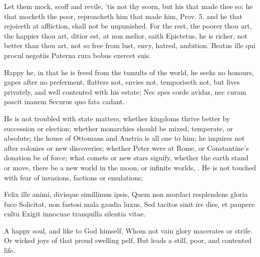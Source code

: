 {Let them mock, scoff and revile, 'tis not thy scorn, but his that made
thee so; he that mocketh the poor, reproacheth him that made him, Prov.
 5. and he that rejoiceth at affliction, shall not be unpunished.
For the rest, the poorer thou art, the happier thou art, ditior est, at
non melior, saith Epictetus, he is richer, not better than thou
art, not so free from lust, envy, hatred, ambition.
Beatus ille qui procul negotiis
Paterna rura bobus exercet suis.

Happy he, in that he is freed from the tumults of the world, he
seeks no honours, gapes after no preferment, flatters not, envies not,
temporiseth not, but lives privately, and well contented with his
estate;
Nec spes corde avidas, nec curam pascit inanem
Securus quo fata cadant.

He is not troubled with state matters, whether kingdoms thrive better
by succession or election; whether monarchies should be mixed,
temperate, or absolute; the house of Ottomans and Austria is all one to
him; he inquires not after colonies or new discoveries; whether Peter
were at Rome, or Constantine's donation be of force; what comets or new
stars signify, whether the earth stand or move, there be a new world in
the moon, or infinite worlds, \etc{}. He is not touched with fear of
invasions, factions or emulations;

Felix ille animi, divisque simillimus ipsis,
Quem non mordaci resplendens gloria fuco
Solicitat, non fastosi mala gaudia luxus,
Sed tacitos sinit ire dies, et paupere cultu
 Exigit innocuae tranquilla silentia vitae.

A happy soul, and like to God himself,
Whom not vain glory macerates or strife.
Or wicked joys of that proud swelling pelf,
But leads a still, poor, and contented life.

}
